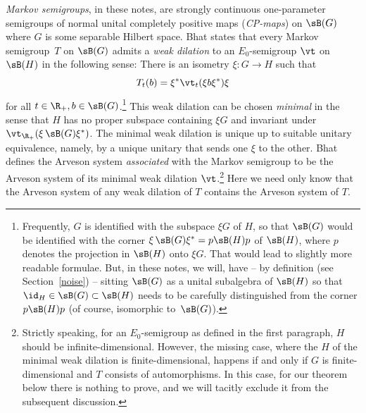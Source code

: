 \bemp \label{WD}
\emph{Markov semigroups}, in these notes, are strongly continuous one-parameter semigroups of normal unital completely positive maps (\emph{CP-maps}) on $\sB(G)$ where $G$ is some separable Hilbert space. Bhat \cite[Theorem~4.7]{Bha96} states that every Markov semigroup~$T$ on $\sB(G)$ admits a \emph{weak dilation} to an $E_0$-semigroup $\vt$ on $\sB(H)$ in the following sense: There is an isometry $\xi\colon G\rightarrow H$ such that
\[
T_t(b)=\xi^*\vt_t(\xi b\xi^*)\xi
\]
for all $t\in\R_+,b\in\sB(G)$.\footnote{Frequently, $G$ is identified with the subspace $\xi G$ of $H$, so that $\sB(G)$ would be identified with the corner $\xi\,\sB(G)\xi^*=p\sB(H)p$ of $\sB(H)$, where $p$ denotes the projection in $\sB(H)$ onto $\xi G$. That would lead to slightly more readable formulae. But, in these notes, we will, have -- by definition (see Section~\ref{noise}) -- sitting $\sB(G)$ as a unital subalgebra of $\sB(H)$ so that $\id_H\in\sB(G)\subset\sB(H)$ needs to be carefully distinguished from the corner $p\sB(H)p$ (of course, isomorphic to~$\sB(G)$).}
This weak dilation can be chosen \emph{minimal} in the sense that $H$ has no proper subspace containing $\xi G$ and invariant under $\vt_{\R_+}(\xi\,\sB(G)\xi^*)$. The minimal weak dilation is unique up to suitable unitary equivalence, namely, by a unique unitary that sends one $\xi$ to the other. Bhat \cite{Bha96} defines the Arveson system \emph{associated} with the Markov semigroup to be the Arveson system of its minimal weak dilation $\vt$.\footnote{Strictly speaking, for an $E_0$-semigroup as defined in the first paragraph, $H$ should be infinite-dimensional. However, the missing case, where the $H$ of the minimal weak dilation is finite-dimensional, happens if and only if $G$ is finite-dimensional and $T$ consists of automorphisms. In this case, for our theorem below there is nothing to prove, and we will tacitly exclude it from the subsequent discussion.} Here we need only know that the Arveson system of any weak dilation of $T$ contains the Arveson system of $T$.
\eemp

